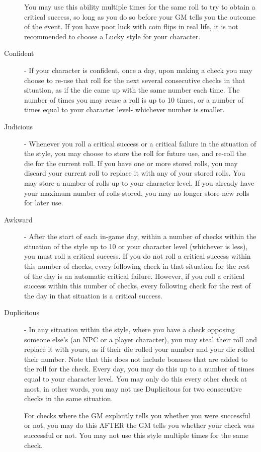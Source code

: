\begin{description}
You may use this ability multiple times for the same roll to try to obtain a critical success, so long as you do so before your GM tells you the outcome of the event. If you have poor luck with coin flips in real life, it is not recommended to choose a Lucky style for your character.
\item[Confident] - If your character is confident, once a day, upon making a check you may choose to re-use that roll for the next several consecutive checks in that situation, as if the die came up with the same number each time. The number of times you may reuse a roll is up to 10 times, or a number of times equal to your character level- whichever number is smaller.
\item[Judicious] - Whenever you roll a critical success or a critical failure in the situation of the style, you may choose to store the roll for future use, and re-roll the die for the current roll. If you have one or more stored rolls, you may discard your current roll to replace it with any of your stored rolls. You may store a number of rolls up to your character level. If you already have your maximum number of rolls stored, you may no longer store new rolls for later use.
\item[Awkward] - After the start of each in-game day, within a number of checks within the situation of the style up to 10 or your character level (whichever is less), you must roll a critical success. If you do not roll a critical success within this number of checks, every following check in that situation for the rest of the day is an automatic critical failure. However, if you roll a critical success within this number of checks, every following check for the rest of the day in that situation is a critical success.
\item[Duplicitous] - In any situation within the style, where you have a check opposing someone else’s (an NPC or a player character), you may steal their roll and replace it with yours, as if their die rolled your number and your die rolled their number. Note that this does not include bonuses that are added to the roll for the check. Every day, you may do this up to a number of times equal to your character level. You may only do this every other check at most, in other words, you may not use Duplicitous for two consecutive checks in the same situation.

For checks where the GM explicitly tells you whether you were successful or not, you may do this AFTER the GM tells you whether your check was successful or not. You may not use this style multiple times for the same check.


\end{description}
